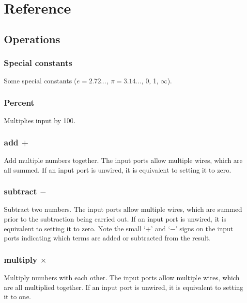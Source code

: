 \chapter{Reference}

\section{Operations}\label{Operations}

\subsection{Special
  constants}\label{Operation:euler}\label{Operation:pi}\label{Operation:zero}\label{Operation:one}
\label{Operation:inf}

Some special constants ($e=2.72\ldots$, $\pi=3.14\ldots$, 0, 1,
$\infty$).

\subsection{Percent} \label{Operation:percent} Multiplies input by 100.

\subsection{add +}\label{Operation:add} Add multiple numbers together. The input
  ports allow multiple wires, which are all summed. If an input port
  is unwired, it is equivalent to setting it to zero.

\subsection{subtract $-$}\label{Operation:subtract} Subtract two numbers. The input
  ports allow multiple wires, which are summed prior to the
  subtraction being carried out. If an input port is unwired, it is
  equivalent to setting it to zero. Note the small `+' and `$-$' signs
  on the input ports indicating which terms are added or subtracted from
  the result.

\subsection{multiply $\times$}\label{Operation:multiply} Multiply numbers with each
  other. The input ports allow multiple wires, which are all
  multiplied together. If an input port is unwired, it is equivalent
  to setting it to one.

